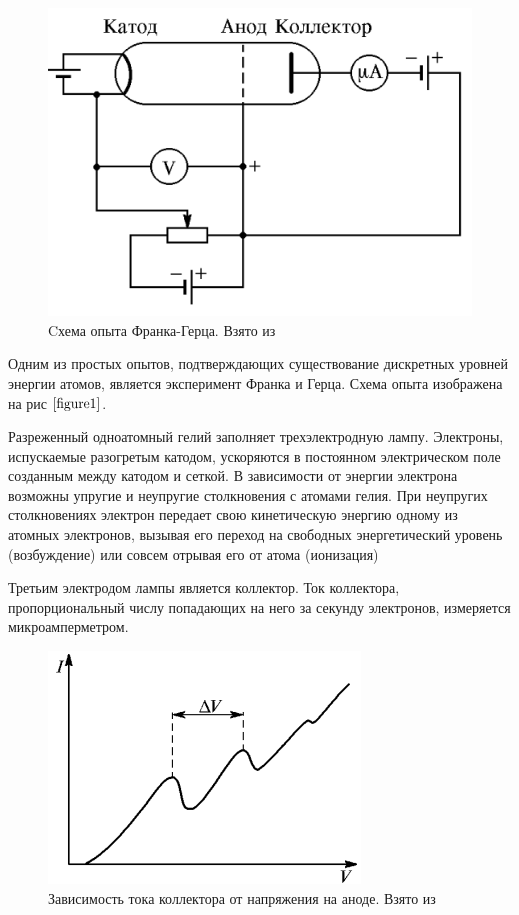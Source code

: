 \documentclass[a4paper,12pt]{article}
\begin{document}
\begin{figure} 
	\includegraphics[width=\linewidth]{fig1}
	\caption{Cхема опыта Франка-Герца. Взято из \cite{lab}}
	\label{figure1}
\end{figure}

Одним из простых опытов, подтверждающих существование дискретных уровней энергии атомов, является эксперимент Франка и Герца. Схема опыта изображена на рис $\ref{figure1}$.

Разреженный одноатомный гелий заполняет трехэлектродную лампу. Электроны, испускаемые разогретым катодом, ускоряются в постоянном электрическом поле  созданным между катодом и сеткой. В зависимости от энергии электрона возможны упругие и неупругие столкновения с атомами гелия. При неупругих столкновениях электрон передает свою кинетическую энергию одному из атомных электронов, вызывая его переход на свободных энергетический уровень (возбуждение) или совсем отрывая его от атома (ионизация)

Третьим электродом лампы является коллектор. Ток коллектора, пропорциональный числу попадающих на него за секунду электронов, измеряется микроамперметром.

\begin{figure} 
	\includegraphics[width=\linewidth]{fig2}
	\caption{Зависимость тока коллектора от напряжения на аноде. Взято из \cite{lab}}
	\label{figure2}
\end{figure}
\end{document}
